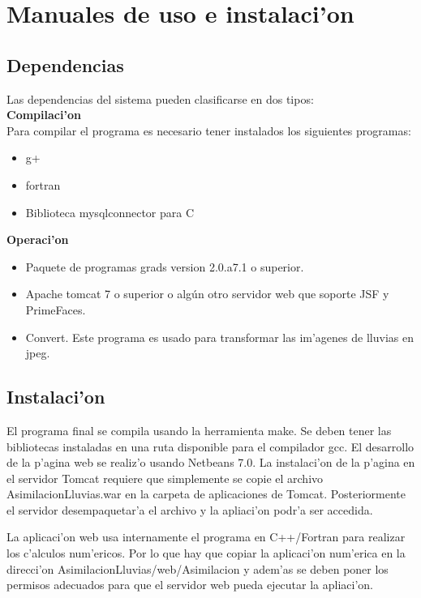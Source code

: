 \chapter{Manuales de uso e instalaci'on}

\section{Dependencias}
Las dependencias del sistema pueden clasificarse en dos tipos:\\
\textbf{Compilaci'on} 
\\
Para compilar el programa es necesario tener instalados los siguientes programas:
\begin{itemize}
 \item g+
  \item fortran
  \item Biblioteca mysqlconnector para C  
\end{itemize}

\textbf{Operaci'on} 

\begin{itemize}
 \item Paquete de programas grads version 2.0.a7.1 o superior.
  \item Apache tomcat 7 o superior o algún otro servidor web que soporte JSF y PrimeFaces.
  \item Convert. Este programa es usado para transformar las im'agenes de lluvias en jpeg.
\end{itemize}

\section{Instalaci'on}
El programa final se compila usando la herramienta make. Se deben
tener las bibliotecas instaladas en una ruta disponible para el
compilador gcc.
El desarrollo de la p'agina web se realiz'o usando Netbeans 7.0. La instalaci'on de la p'agina en el servidor Tomcat requiere que
simplemente se copie el archivo AsimilacionLluvias.war en la carpeta de aplicaciones de Tomcat. Posteriormente el servidor 
desempaquetar'a el archivo y la apliaci'on podr'a ser accedida.

La aplicaci'on web usa internamente el programa en C++/Fortran para realizar los c'alculos num'ericos. Por lo que hay que copiar
la aplicaci'on num'erica en la direcci'on AsimilacionLluvias/web/Asimilacion y adem'as se deben poner los permisos adecuados para
que el servidor web pueda ejecutar la apliaci'on.

